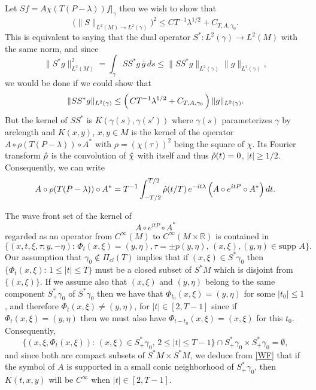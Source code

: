 \documentclass[10pt]{amsart}
\begin{document}
Let $Sf=A\chi(T(P-\lambda))f|_{\gamma}$ then we wish to show that 
$$\bigl(\|S\|_{L^2(M)\to L^2(\gamma)}\bigr)^2\le CT^{-1}\lambda^{1/2}+C_{T,A,\gamma_0}.$$
This is equivalent to saying that the dual operator $S^*: L^2(\gamma)\to L^2(M)$ with
the same norm, and since
$$\|S^*g\|^2_{L^2(M)}=\int_\gamma SS^*g\, \overline{g} \, ds
\le \|SS^*g\|_{L^2(\gamma)}\|g\|_{L^2(\gamma)},$$
we would be done if we could show that 
\begin{equation}\label{2.13}
\|SS^*g\|_{L^2(\gamma)}\le
\Bigl(\, CT^{-1}\lambda^{1/2}+C_{T,A,\gamma_0}\, \Bigr)\, \|g\|_{L^2(\gamma)}.
\end{equation}
But the kernel of $SS^*$ is $K(\gamma(s),\gamma(s'))$
where $\gamma(s)$ parameterizes $\gamma$ by arclength and $K(x,y)$,
$x,y\in M$ is the kernel of the operator $A\circ \rho(T(P-\lambda))\circ A^*$
with $\rho = (\chi(\tau))^2$ being the square of $\chi$.  Its Fourier transform
$\Hat \rho$ is the convolution of $\Hat \chi$ with itself and thus
$\Hat \rho(t)=0$, $|t|\ge1/2$.  Consequently, we can write
\begin{equation}\label{2.14}
A\circ \rho(T(P-\lambda))\circ A^* = T^{-1}\int_{-T/2}^{T/2}
\Hat \rho(t/T) \, e^{-it{\lambda}} \, \Bigl(A\circ e^{itP}\circ A^*\Bigr)\, dt.
\end{equation}

The wave front set of the kernel of 
$$A\circ e^{itP}\circ A^*$$
regarded as an operator from $C^\infty(M)$ to $C^\infty(M\times {\mathbb R})$ is contained in
\begin{equation}\label{WF}
\{(x,t,\xi,\tau; y,-\eta): \, \Phi_t(x,\xi)=(y,\eta), \tau =\pm p(y,\eta), \, 
(x,\xi), (y,\eta)\in \text{supp }A\}.
\end{equation}
Our assumption that $\gamma_0\notin {\varPi}_{cl}(T)$ 
implies that if $(x,\xi)\in S^*\gamma_0$
then $\{\Phi_t(x,\xi): \, 1\le |t|\le T\}$ must be a closed subset of $S^*M$ which is disjoint
from $\{(x,\xi)\}$.  If we assume also that $(x,\xi)$ and $(y,\eta)$ belong to the
same component $S^*_+\gamma_0$ of $S^*\gamma_0$ then we have that $\Phi_{t_0}(x,\xi)
=(y,\eta)$ for some $|t_0|\le1$, and therefore $\Phi_t(x,\xi)\ne (y,\eta)$,
 for $|t|\in [2,T-1]$ since if $\Phi_{t}(x,\xi)=(y,\eta)$ then we
must also have $\Phi_{t-t_0}(x,\xi)=(x,\xi)$ for this $t_0$.  
Consequently,
$$\{(x,\xi, \Phi_t(x,\xi)): \, (x,\xi)\in S^*_+\gamma_0, \, 2\le |t|\le T-1\}
\cap S^*_+\gamma_0 \times S^*_+\gamma_0 = \emptyset,$$
and since both are compact subsets of $S^*M\times S^*M$, we deduce from \eqref{WF}
that if the symbol
of $A$ is supported in a small conic neighborhood of $S^*_+\gamma_0$,
then $K(t,x,y)$ will be $C^\infty$ when $|t|\in [2,T-1]$.
\end{document}
